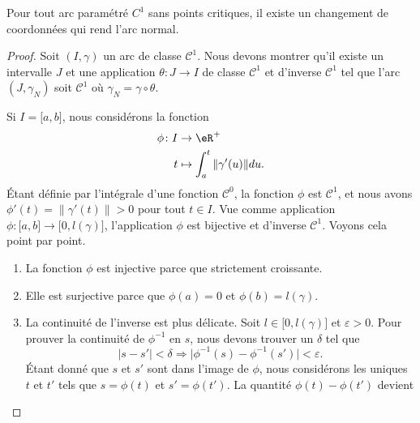 \begin{proposition}     \label{PropExisteChmNorm}
	Pour tout arc paramétré \( C^1\) sans points critiques, il existe un changement de coordonnées qui rend l'arc normal.
\end{proposition}

\begin{proof}
	Soit \( (I,\gamma)\) un arc de classe \( \mathcal{C}^1\). Nous devons montrer qu'il existe un intervalle \( J\) et une application \( \theta\colon J\to I\) de classe \( \mathcal{C}^1\) et d'inverse \( \mathcal{C}^1\) tel que l'arc \( (J,\gamma_N)\) soit \( \mathcal{C}^1\) où \( \gamma_N=\gamma\circ\theta\).

	Si \( I=\mathopen[ a ,b \mathclose]\), nous considérons la fonction
	\begin{equation}        \label{EqDevVarPhi}
		\begin{aligned}
			\phi\colon I & \to \eR^+                           \\
			t            & \mapsto \int_a^t\| \gamma'(u) \|du.
		\end{aligned}
	\end{equation}
	Étant définie par l'intégrale d'une fonction \( \mathcal{C}^0\), la fonction \( \phi\) est \( \mathcal{C}^1\), et nous avons \( \phi'(t)=\| \gamma'(t) \|>0\) pour tout \( t\in I\). Vue comme application \( \phi\colon \mathopen[ a , b \mathclose]\to \mathopen[ 0 , l(\gamma) \mathclose]\), l'application \( \phi\) est bijective et d'inverse \( \mathcal{C}^1\). Voyons cela point par point.
	\begin{enumerate}
		\item
		      La fonction \( \phi\) est injective parce que strictement croissante.
		\item
		      Elle est surjective parce que \( \phi(a)=0\) et \( \phi(b)=l(\gamma)\).
		\item
		      La continuité de l'inverse est plus délicate. Soit \( l\in\mathopen[ 0 , l(\gamma) \mathclose]\) et \( \varepsilon>0\). Pour prouver la continuité de \( \phi^{-1}\) en \( s\), nous devons trouver un \( \delta\) tel que
		      \begin{equation}
			      | s-s' |<\delta\Rightarrow\big| \phi^{-1}(s)-\phi^{-1}(s') \big|<\varepsilon.
		      \end{equation}
		      Étant donné que \( s\) et \( s'\) sont dans l'image de \( \phi\), nous considérons les uniques \( t\) et \( t'\) tels que \( s=\phi(t)\) et \( s'=\phi(t')\). La quantité \( \phi(t)-\phi(t')\) devient
		      \begin{equation}        \label{EqCondvpemuCont}

\end{equation}
\end{enumerate}
\end{proof}
